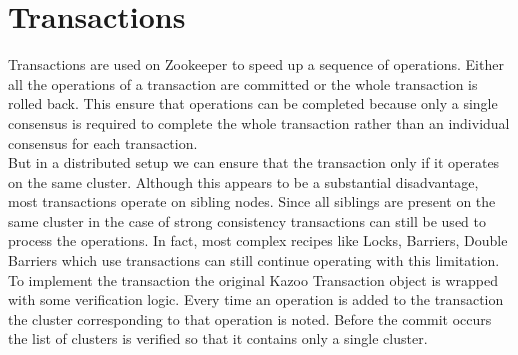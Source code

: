 \section{Transactions}
Transactions are used on Zookeeper to speed up a sequence of operations. Either all the operations of a transaction are committed or the whole transaction is rolled back. This ensure that operations can be completed because only a single consensus is required to complete the whole transaction rather than an individual consensus for each transaction.\\
    But in a distributed setup we can ensure that the transaction only if it operates on the same cluster. Although this appears to be a substantial disadvantage, most transactions operate on sibling nodes. Since all siblings are present on the same cluster in the case of strong consistency transactions can still be used to process the operations. In fact, most complex recipes like Locks, Barriers, Double Barriers which use transactions can still continue operating with this limitation.
    To implement the transaction the original Kazoo Transaction object is wrapped with some verification logic. Every time an operation is added to the transaction the cluster corresponding to that operation is noted. Before the commit occurs the list of clusters is verified so that it contains only a single cluster.
    
